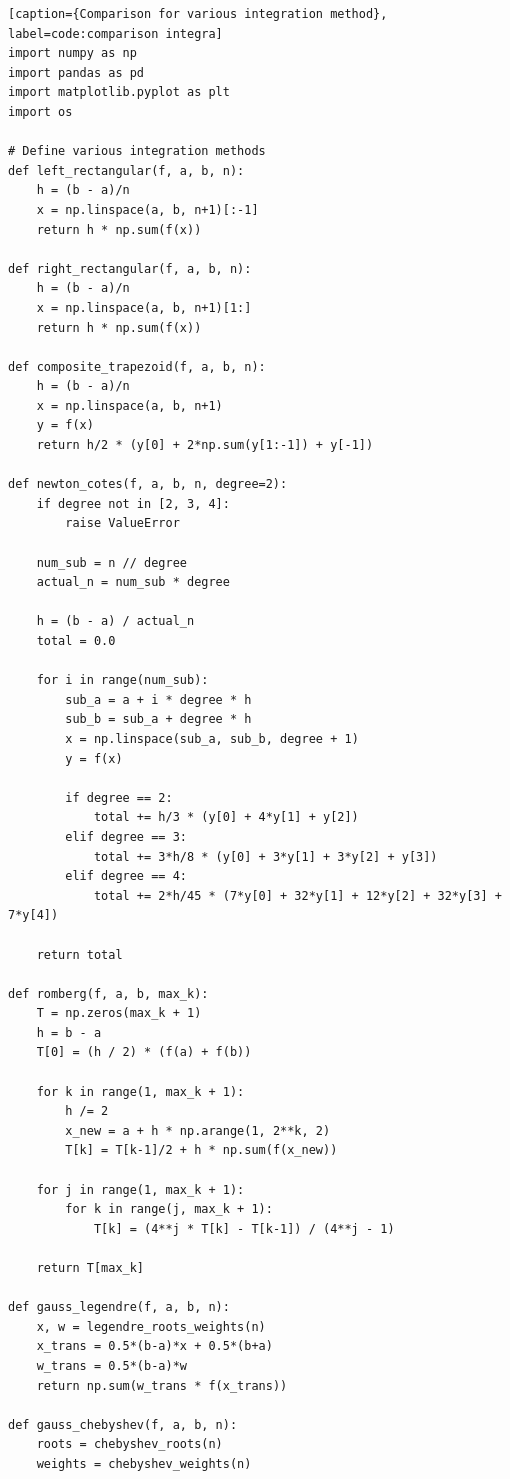 \documentclass[10pt]{article}
\begin{document}
\begin{lstlisting}[style=custompython][caption={Comparison for various integration method}, label=code:comparison integra]
import numpy as np
import pandas as pd
import matplotlib.pyplot as plt
import os

# Define various integration methods
def left_rectangular(f, a, b, n):
    h = (b - a)/n
    x = np.linspace(a, b, n+1)[:-1]
    return h * np.sum(f(x))

def right_rectangular(f, a, b, n):
    h = (b - a)/n
    x = np.linspace(a, b, n+1)[1:]
    return h * np.sum(f(x))

def composite_trapezoid(f, a, b, n):
    h = (b - a)/n
    x = np.linspace(a, b, n+1)
    y = f(x)
    return h/2 * (y[0] + 2*np.sum(y[1:-1]) + y[-1])

def newton_cotes(f, a, b, n, degree=2):
    if degree not in [2, 3, 4]:
        raise ValueError
    
    num_sub = n // degree
    actual_n = num_sub * degree
    
    h = (b - a) / actual_n
    total = 0.0
    
    for i in range(num_sub):
        sub_a = a + i * degree * h
        sub_b = sub_a + degree * h
        x = np.linspace(sub_a, sub_b, degree + 1)
        y = f(x)
        
        if degree == 2:
            total += h/3 * (y[0] + 4*y[1] + y[2])
        elif degree == 3: 
            total += 3*h/8 * (y[0] + 3*y[1] + 3*y[2] + y[3])
        elif degree == 4: 
            total += 2*h/45 * (7*y[0] + 32*y[1] + 12*y[2] + 32*y[3] + 7*y[4])
    
    return total

def romberg(f, a, b, max_k):
    T = np.zeros(max_k + 1)
    h = b - a
    T[0] = (h / 2) * (f(a) + f(b))
    
    for k in range(1, max_k + 1):
        h /= 2
        x_new = a + h * np.arange(1, 2**k, 2)
        T[k] = T[k-1]/2 + h * np.sum(f(x_new))
    
    for j in range(1, max_k + 1):
        for k in range(j, max_k + 1):
            T[k] = (4**j * T[k] - T[k-1]) / (4**j - 1)
    
    return T[max_k]

def gauss_legendre(f, a, b, n):
    x, w = legendre_roots_weights(n)
    x_trans = 0.5*(b-a)*x + 0.5*(b+a)
    w_trans = 0.5*(b-a)*w
    return np.sum(w_trans * f(x_trans))

def gauss_chebyshev(f, a, b, n):
    roots = chebyshev_roots(n)
    weights = chebyshev_weights(n)
    

\end{lstlisting}
\end{document}
